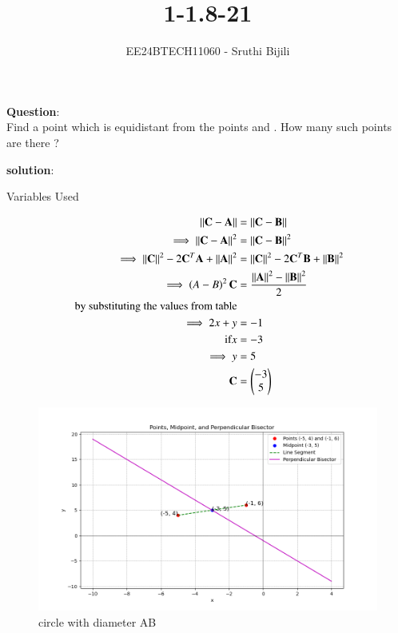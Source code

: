 \documentclass[journal]{IEEEtran}
\begin{document}

\vspace{3cm}

\title{1-1.8-21}
\author{EE24BTECH11060 - Sruthi Bijili}
{\let\newpage\relax\maketitle}

\renewcommand{\thefigure}{\theenumi}
\renewcommand{\thetable}{\theenumi}
\setlength{\intextsep}{10pt} %


\renewcommand{\thetable}{\theenumi}

\textbf{Question}:\\
Find a point which is equidistant from the points  and . How many such points are there ?

\textbf{solution}:\\
\begin{table}[h!]    
  \centering
  
  \caption{Variables Used}
  \label{tab1.1.8.21}
\end{table}
\begin{align}
\left\vert\left\vert\mathbf{C}-\mathbf{A}\right\vert\right\vert&=\left\vert\left\vert\mathbf{C}-\mathbf{B}\right\vert\right\vert\\
\implies\left\vert\left\vert\mathbf{C}-\mathbf{A}\right\vert\right\vert^2&=\left\vert\left\vert\mathbf{C}-\mathbf{B}\right\vert\right\vert^2\\
\implies\left\vert\left\vert\mathbf{C}\right\vert\right\vert^2-2\mathbf{C}^T\mathbf{A}+\left\vert\left\vert\mathbf{A}\right\vert\right\vert^2&=\left\vert\left\vert\mathbf{C}\right\vert\right\vert^2-2\mathbf{C}^T\mathbf{B}+\left\vert\left\vert\mathbf{B}\right\vert\right\vert^2\\
\implies\left(A-B\right)^2\mathbf{C}&=\frac{\left\vert\left\vert\mathbf{A}\right\vert\right\vert^2-\left\vert\left\vert\mathbf{B}\right\vert\right\vert^2}{2}\\
\text{ by substituting the values from table}\\
\implies 2x+y&=-1\\
\text{if} x&=-3\\
\implies y&=5\\
\mathbf{C}&=\begin{pmatrix}-3 \\ 5\end{pmatrix}
\end{align}
\begin{figure}[h!]
   \centering
   \includegraphics[width=0.7\linewidth]{figs/fig1.png}
   \caption{circle with diameter AB}
\end{figure}
\end{document}
